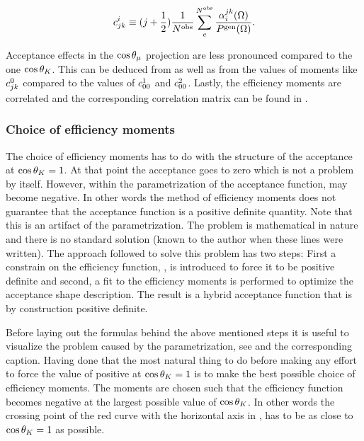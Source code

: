 \begin{equation}
\centering
 c^i_{jk} \equiv (j + \frac{1}{2})  \frac{1}{\Nobs} \sum_e^{\Nobs} \frac{\effbase}{\Pgen}.
  \label{eff_moms_calc_final}
\end{equation}

\noindent Acceptance effects in the $\cos\theta_{\mu}$ projection are less pronounced compared to the one $\cos\theta_{K}$.
This can be deduced from  as well as from the values of moments like $c^{0}_{jk}$
compared to the values of $c^{1}_{00}$ and $c^{2}_{00}$. Lastly, the efficiency moments are
correlated and the corresponding correlation matrix can be found in .

\subsubsection{Choice of efficiency moments}
The choice of efficiency moments has to do with the structure of the acceptance at $\cos\theta_{K}=1$. At that point the acceptance goes to zero
which is not a problem by itself. However, within the parametrization of the acceptance function,  may become negative.
In other words the method of efficiency moments does not guarantee that the acceptance function is a positive definite quantity.
Note that this is an artifact of the parametrization. The problem is mathematical in nature and there is no standard solution (known
to the author when these lines were written). The approach followed to solve this problem has two steps: First a constrain on the
efficiency function, , is introduced to force it to be positive definite and second, a fit to the efficiency
moments is performed to optimize the acceptance shape description. The result is a hybrid acceptance function that is by
construction positive definite.

Before laying out the formulas behind the above mentioned steps it is useful to visualize the problem caused by the parametrization, see 
and the corresponding caption. Having done that the most natural thing to do before making any effort to force the value of 
positive at $\cos\theta_{K}=1$ is to make the best possible choice of efficiency moments. The moments are chosen such that the efficiency function becomes negative
at the largest possible value of $\cos\theta_{K}$. In other words the crossing point of the red curve with the horizontal axis in ,
has to be as close to $\cos\theta_{K}=1$ as possible.

